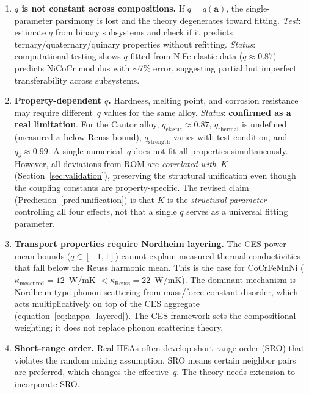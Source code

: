 \documentclass[12pt,letterpaper]{article}
\theoremstyle{definition}
\begin{document}
\begin{enumerate}
  \item \textbf{$q$ is not constant across compositions.}  If $q = q(\mathbf{a})$, the single-parameter parsimony is lost and the theory degenerates toward fitting.  \emph{Test}: estimate $q$ from binary subsystems and check if it predicts ternary/quaternary/quinary properties without refitting.  \emph{Status}: computational testing shows $q$ fitted from NiFe elastic data ($q \approx 0.87$) predicts NiCoCr modulus with $\sim$7\% error, suggesting partial but imperfect transferability across subsystems.

  \item \textbf{Property-dependent $q$.}  Hardness, melting point, and corrosion resistance may require different~$q$ values for the same alloy.  \emph{Status}: \textbf{confirmed as a real limitation}.  For the Cantor alloy, $q_{\mathrm{elastic}} \approx 0.87$, $q_{\mathrm{thermal}}$ is undefined (measured $\kappa$ below Reuss bound), $q_{\mathrm{strength}}$ varies with test condition, and $q_{\delta} \approx 0.99$.  A single numerical~$q$ does not fit all properties simultaneously.  However, all deviations from ROM are \emph{correlated with}~$K$ (Section~\ref{sec:validation}), preserving the structural unification even though the coupling constants are property-specific.  The revised claim (Prediction~\ref{pred:unification}) is that $K$ is the \emph{structural parameter} controlling all four effects, not that a single $q$ serves as a universal fitting parameter.

  \item \textbf{Transport properties require Nordheim layering.}  The CES power mean bounds ($q \in [-1, 1]$) cannot explain measured thermal conductivities that fall below the Reuss harmonic mean.  This is the case for CoCrFeMnNi ($\kappa_{\mathrm{measured}} = 12$~W/mK $< \kappa_{\mathrm{Reuss}} = 22$~W/mK).  The dominant mechanism is Nordheim-type phonon scattering from mass/force-constant disorder, which acts multiplicatively on top of the CES aggregate (equation~\ref{eq:kappa_layered}).  The CES framework sets the compositional weighting; it does not replace phonon scattering theory.

  \item \textbf{Short-range order.}  Real HEAs often develop short-range order (SRO) that violates the random mixing assumption.  SRO means certain neighbor pairs are preferred, which changes the effective~$q$.  The theory needs extension to incorporate SRO.


\end{enumerate}
\end{document}
